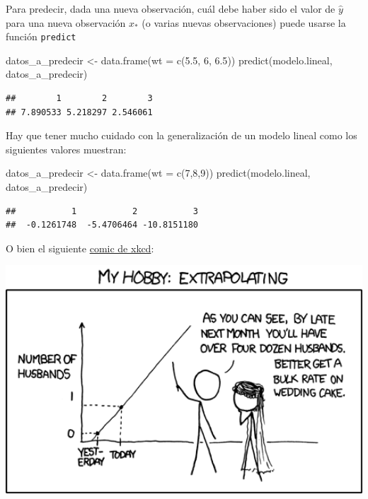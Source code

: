 \documentclass[
]{book}
\newenvironment{Shaded}{\begin{snugshade}}{\end{snugshade}}
\newcommand{\AttributeTok}[1]{\textcolor[rgb]{0.77,0.63,0.00}{#1}}
\newcommand{\DecValTok}[1]{\textcolor[rgb]{0.00,0.00,0.81}{#1}}
\newcommand{\FloatTok}[1]{\textcolor[rgb]{0.00,0.00,0.81}{#1}}
\newcommand{\FunctionTok}[1]{\textcolor[rgb]{0.00,0.00,0.00}{#1}}
\newcommand{\NormalTok}[1]{#1}
\newcommand{\OtherTok}[1]{\textcolor[rgb]{0.56,0.35,0.01}{#1}}
\begin{document}
Para predecir, dada una nueva observación, cuál debe haber sido el valor de \(\hat{y}\) para una nueva observación \(x_*\) (o varias nuevas observaciones) puede usarse la función \texttt{predict}

\begin{Shaded}
\begin{Highlighting}[]
\NormalTok{datos\_a\_predecir }\OtherTok{\textless{}{-}} \FunctionTok{data.frame}\NormalTok{(}\AttributeTok{wt =} \FunctionTok{c}\NormalTok{(}\FloatTok{5.5}\NormalTok{, }\DecValTok{6}\NormalTok{, }\FloatTok{6.5}\NormalTok{))}
\FunctionTok{predict}\NormalTok{(modelo.lineal, datos\_a\_predecir)}
\end{Highlighting}
\end{Shaded}

\begin{verbatim}
##        1        2        3 
## 7.890533 5.218297 2.546061
\end{verbatim}

Hay que tener mucho cuidado con la generalización de un modelo lineal como los siguientes valores muestran:

\begin{Shaded}
\begin{Highlighting}[]
\NormalTok{datos\_a\_predecir }\OtherTok{\textless{}{-}} \FunctionTok{data.frame}\NormalTok{(}\AttributeTok{wt =} \FunctionTok{c}\NormalTok{(}\DecValTok{7}\NormalTok{,}\DecValTok{8}\NormalTok{,}\DecValTok{9}\NormalTok{))}
\FunctionTok{predict}\NormalTok{(modelo.lineal, datos\_a\_predecir)}
\end{Highlighting}
\end{Shaded}

\begin{verbatim}
##           1           2           3 
##  -0.1261748  -5.4706464 -10.8151180
\end{verbatim}

O bien el siguiente \href{https://xkcd.com/605/}{comic de xkcd}:

\includegraphics[width=6.4in]{images/extrapolating}
\end{document}
